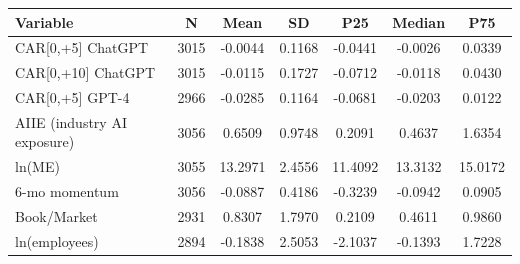 \begin{tabular}{lcccccc}
\toprule
Variable & N & Mean & SD & P25 & Median & P75 \\
\midrule
CAR[0,+5] ChatGPT & 3015 & -0.0044 & 0.1168 & -0.0441 & -0.0026 & 0.0339 \\
CAR[0,+10] ChatGPT & 3015 & -0.0115 & 0.1727 & -0.0712 & -0.0118 & 0.0430 \\
CAR[0,+5] GPT-4 & 2966 & -0.0285 & 0.1164 & -0.0681 & -0.0203 & 0.0122 \\
AIIE (industry AI exposure) & 3056 & 0.6509 & 0.9748 & 0.2091 & 0.4637 & 1.6354 \\
ln(ME) & 3055 & 13.2971 & 2.4556 & 11.4092 & 13.3132 & 15.0172 \\
6-mo momentum & 3056 & -0.0887 & 0.4186 & -0.3239 & -0.0942 & 0.0905 \\
Book/Market & 2931 & 0.8307 & 1.7970 & 0.2109 & 0.4611 & 0.9860 \\
ln(employees) & 2894 & -0.1838 & 2.5053 & -2.1037 & -0.1393 & 1.7228 \\
\bottomrule
\end{tabular}